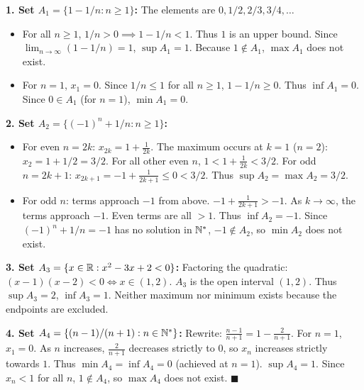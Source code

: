 \begin{solution}
\textbf{1. Set $A_1 = \{1 - 1/n : n \ge 1\}$:}
The elements are $0, 1/2, 2/3, 3/4, \dots$
\begin{itemize}[leftmargin=1.5em,itemsep=1pt]
  \item For all $n \ge 1$, $1/n > 0 \implies 1 - 1/n < 1$. Thus $1$ is an upper bound.
  Since $\lim_{n \to \infty} (1 - 1/n) = 1$, $\sup A_1 = 1$. Because $1 \notin A_1$, $\max A_1$ does not exist.
  \item For $n = 1$, $x_1 = 0$. Since $1/n \le 1$ for all $n \ge 1$, $1 - 1/n \ge 0$.
  Thus $\inf A_1 = 0$. Since $0 \in A_1$ (for $n=1$), $\min A_1 = 0$.
\end{itemize}

\textbf{2. Set $A_2 = \{(-1)^n + 1/n : n \ge 1\}$:}
\begin{itemize}[leftmargin=1.5em,itemsep=1pt]
  \item For even $n = 2k$: $x_{2k} = 1 + \frac{1}{2k}$.
  The maximum occurs at $k=1$ ($n=2$): $x_2 = 1 + 1/2 = 3/2$.
  For all other even $n$, $1 < 1 + \frac{1}{2k} < 3/2$.
  For odd $n = 2k+1$: $x_{2k+1} = -1 + \frac{1}{2k+1} \le 0 < 3/2$.
  Thus $\sup A_2 = \max A_2 = 3/2$.
  \item For odd $n$: terms approach $-1$ from above.
  $-1 + \frac{1}{2k+1} > -1$. As $k \to \infty$, the terms approach $-1$.
  Even terms are all $> 1$.
  Thus $\inf A_2 = -1$. Since $(-1)^n + 1/n = -1$ has no solution in $\mathbb{N}^*$, $-1 \notin A_2$, so $\min A_2$ does not exist.
\end{itemize}

\textbf{3. Set $A_3 = \{x \in \mathbb{R} : x^2 - 3x + 2 < 0\}$:}
Factoring the quadratic: $(x - 1)(x - 2) < 0 \iff x \in (1, 2)$.
$A_3$ is the open interval $(1, 2)$.
Thus $\sup A_3 = 2$, $\inf A_3 = 1$. Neither maximum nor minimum exists because the endpoints are excluded.

\textbf{4. Set $A_4 = \{(n - 1)/(n + 1) : n \in \mathbb{N}^*\}$:}
Rewrite: $\frac{n - 1}{n + 1} = 1 - \frac{2}{n + 1}$.
For $n = 1$, $x_1 = 0$. As $n$ increases, $\frac{2}{n+1}$ decreases strictly to $0$, so $x_n$ increases strictly towards $1$.
Thus $\min A_4 = \inf A_4 = 0$ (achieved at $n=1$).
$\sup A_4 = 1$. Since $x_n < 1$ for all $n$, $1 \notin A_4$, so $\max A_4$ does not exist. \hfill $\blacksquare$
\end{solution}

